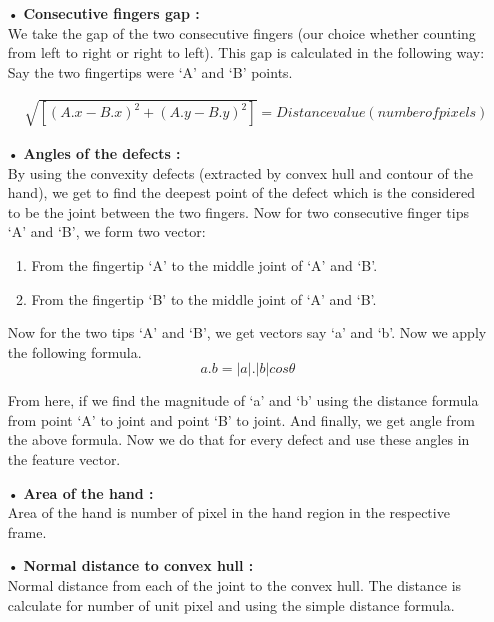 \begin{itemize}


   \item[•] \textbf {	Consecutive fingers gap :  \\}
  We take the gap of the two consecutive fingers (our choice whether counting from left to right or right to left). This gap      is calculated in the following way:
Say the two fingertips were ‘A’ and ‘B’ points.


\begin{align}
&\sqrt{ [( A.x - B.x )^2 + ( A.y - B.y )^2]} = Distance value (number of pixels)
\end{align}
\item[•] \textbf { Angles of the defects : \\}
  By using the convexity defects (extracted by convex hull and contour of the hand), we get to find the deepest point of the defect which is the considered to be the joint between the two fingers. Now for two consecutive finger tips ‘A’ and ‘B’, we form two vector:
  \begin{enumerate}
  \item From the fingertip ‘A’ to the middle joint of ‘A’ and ‘B’. 
  \item From the fingertip ‘B’ to the middle joint of ‘A’ and ‘B’.
  \end{enumerate}
  Now for the two tips ‘A’ and ‘B’, we get vectors say ‘a’ and ‘b’. Now we apply the following formula.
\begin{equation}
a.b=|a|.|b|cos\theta
\end{equation}
   
From here, if we find the magnitude of ‘a’ and ‘b’ using the distance formula from point ‘A’ to joint and point ‘B’ to joint. And finally, we get angle from the above formula. Now we do that for every defect and use these angles in the feature vector.
 \item[•] \textbf { Area of the hand  : \\}
Area of the hand is number of pixel in the hand region in the respective frame. 
 \item[•] \textbf {Normal distance to convex hull : \\}
Normal distance from each of the joint to the convex hull. The distance is calculate for number of unit pixel and using the simple distance formula.
\end{itemize}

